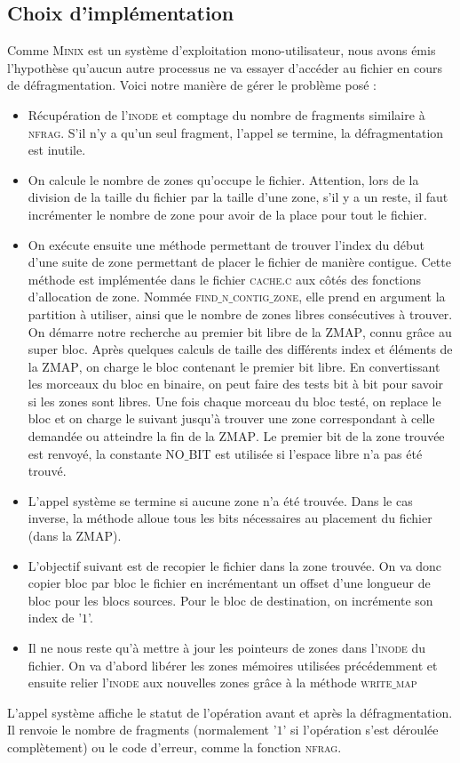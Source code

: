 \subsection*{Choix d'implémentation}
Comme \textsc{Minix} est un système d'exploitation mono-utilisateur, nous avons émis l'hypothèse qu'aucun autre processus ne va essayer d'accéder au fichier en cours de défragmentation. 
Voici notre manière de gérer le problème posé :
\begin{itemize}
\item Récupération de l'\textsc{inode} et comptage du nombre de fragments similaire à \textsc{nfrag}. S'il n'y a qu'un seul fragment, l'appel se termine, la défragmentation est inutile.
\item On calcule le nombre de zones qu'occupe le fichier. Attention, lors de la division de la taille du fichier par la taille d'une zone, s'il y a un reste, il faut incrémenter le nombre de zone pour avoir de la place pour tout le fichier.
\item On exécute ensuite une méthode permettant de trouver l'index du début d'une suite de zone permettant de placer le fichier de manière contigue. Cette méthode est implémentée dans le fichier \textsc{cache.c} aux côtés des fonctions d'allocation de zone. Nommée \textsc{find$\_$n$\_$contig$\_$zone}, elle prend en argument la partition à utiliser, ainsi que le nombre de zones libres consécutives à trouver. On démarre notre recherche au premier bit libre de la \textsc{ZMAP}, connu grâce au super bloc. Après quelques calculs de taille des différents index et éléments de la \textsc{ZMAP}, on charge le bloc contenant le premier bit libre. En convertissant les morceaux du bloc en binaire, on peut faire des tests bit à bit pour savoir si les zones sont libres. Une fois chaque morceau du bloc testé, on replace le bloc et on charge le suivant jusqu'à trouver une zone correspondant à celle demandée ou atteindre la fin de la \textsc{ZMAP}. Le premier bit de la zone trouvée est renvoyé, la constante \textsc{NO$\_$BIT} est utilisée si l'espace libre n'a pas été trouvé.
\item L'appel système se termine si aucune zone n'a été trouvée. Dans le cas inverse, la méthode alloue tous les bits nécessaires au placement du fichier (dans la \textsc{ZMAP}). 
\item L'objectif suivant est de recopier le fichier dans la zone trouvée. On va donc copier bloc par bloc le fichier en incrémentant un offset d'une longueur de bloc pour les blocs sources. Pour le bloc de destination, on incrémente son index de '$1$'. 
\item Il ne nous reste qu'à mettre à jour les pointeurs de zones dans l'\textsc{inode} du fichier. On va d'abord libérer les zones mémoires utilisées précédemment et ensuite relier l'\textsc{inode} aux nouvelles zones grâce à la méthode \textsc{write$\_$map}
\end{itemize}

L'appel système affiche le statut de l'opération avant et après la défragmentation. Il renvoie le nombre de fragments (normalement '$1$' si l'opération s'est déroulée complètement) ou le code d'erreur, comme la fonction \textsc{nfrag}.